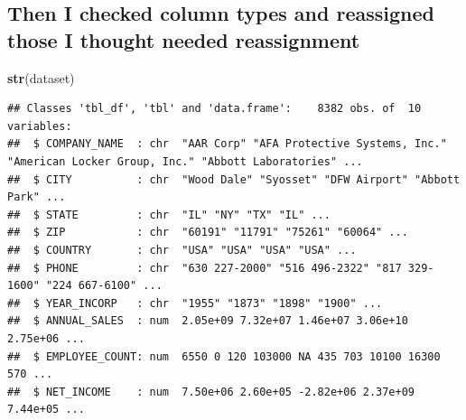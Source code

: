 \documentclass[]{article}
\newenvironment{Shaded}{\begin{snugshade}}{\end{snugshade}}
\newcommand{\KeywordTok}[1]{\textcolor[rgb]{0.13,0.29,0.53}{\textbf{#1}}}
\newcommand{\NormalTok}[1]{#1}
\begin{document}
\hypertarget{then-i-checked-column-types-and-reassigned-those-i-thought-needed-reassignment}{%
\subsection{Then I checked column types and reassigned those I thought
needed
reassignment}\label{then-i-checked-column-types-and-reassigned-those-i-thought-needed-reassignment}}

\begin{Shaded}
\begin{Highlighting}[]
\KeywordTok{str}\NormalTok{(dataset)}
\end{Highlighting}
\end{Shaded}

\begin{verbatim}
## Classes 'tbl_df', 'tbl' and 'data.frame':    8382 obs. of  10 variables:
##  $ COMPANY_NAME  : chr  "AAR Corp" "AFA Protective Systems, Inc." "American Locker Group, Inc." "Abbott Laboratories" ...
##  $ CITY          : chr  "Wood Dale" "Syosset" "DFW Airport" "Abbott Park" ...
##  $ STATE         : chr  "IL" "NY" "TX" "IL" ...
##  $ ZIP           : chr  "60191" "11791" "75261" "60064" ...
##  $ COUNTRY       : chr  "USA" "USA" "USA" "USA" ...
##  $ PHONE         : chr  "630 227-2000" "516 496-2322" "817 329-1600" "224 667-6100" ...
##  $ YEAR_INCORP   : chr  "1955" "1873" "1898" "1900" ...
##  $ ANNUAL_SALES  : num  2.05e+09 7.32e+07 1.46e+07 3.06e+10 2.75e+06 ...
##  $ EMPLOYEE_COUNT: num  6550 0 120 103000 NA 435 703 10100 16300 570 ...
##  $ NET_INCOME    : num  7.50e+06 2.60e+05 -2.82e+06 2.37e+09 7.44e+05 ...
\end{verbatim}
\end{document}
